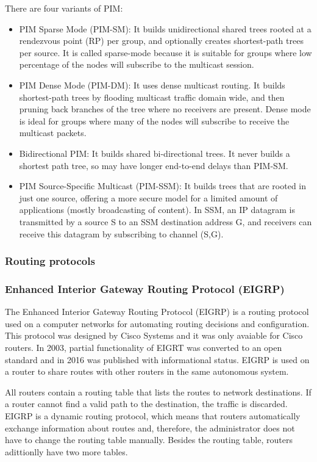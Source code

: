 There are four variants of PIM:

\begin{itemize}
\item PIM Sparse Mode (PIM-SM): It builds unidirectional shared trees rooted at a rendezvous point (RP) per group, and optionally creates shortest-path trees per source. It is called sparse-mode because it is suitable for groups where low percentage of the nodes will subscribe to the multicast session.
\item PIM Dense Mode (PIM-DM): It uses dense multicast routing. It builds shortest-path trees by flooding multicast traffic domain wide, and then pruning back branches of the tree where no receivers are present. Dense mode is ideal for groups where many of the nodes will subscribe to receive the multicast packets.
\item Bidirectional PIM: It builds shared bi-directional trees. It never builds a shortest path tree, so may have longer end-to-end delays than PIM-SM.
\item PIM Source-Specific Multicast (PIM-SSM): It builds trees that are rooted in just one source, offering a more secure model for a limited amount of applications (mostly broadcasting of content). In SSM, an IP datagram is transmitted by a source S to an SSM destination address G, and receivers can receive this datagram by subscribing to channel (S,G).
\end{itemize}

\subsubsection{Routing protocols}

\subsubsection*{Enhanced Interior Gateway Routing Protocol (EIGRP)\cite{EIGRP}}
The Enhanced Interior Gateway Routing Protocol (EIGRP) is a routing protocol used on a computer networks for automating routing decisions and configuration. This protocol was designed by Cisco Systems and it was only avaiable for Cisco routers. In 2003, partial functionality of EIGRT was converted to an open standard and in 2016 was published with informational status. EIGRP is used on a router to share routes with other routers in the same autonomous system.

All routers contain a routing table that lists the routes to network destinations. If a router cannot find a valid path to the destination, the traffic is discarded. EIGRP is a dynamic routing protocol, which means that routers automatically exchange information about routes and, therefore, the administrator does not have to change the routing table manually. Besides the routing table, routers adittionlly have two more tables.

